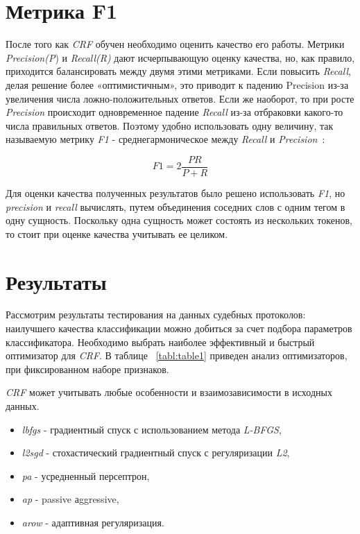 \documentclass{csmathnotes}
\begin{document}
\section*{Метрика F1}
После того как \emph{CRF} обучен необходимо оценить качество его работы. 
Метрики \emph{Precision(P}) и \emph{Recall(R)} дают исчерпывающую оценку качества, но, как правило, приходится балансировать между двумя этими метриками.
Если повысить \emph{Recall}, делая решение более «оптимистичным», это приводит к падению Precision из-за увеличения числа ложно-положительных ответов.
Если же наоборот, то при росте \emph{Precision} происходит одновременное падение \emph{Recall} из-за отбраковки какого-то числа правильных ответов.
Поэтому удобно использовать одну величину, так называемую метрику \emph{F1} - среднегармоническое между \emph{Recall} и \emph{Precision}~\cite{А1}:

\begin{equation}
F1 = 2\frac{P R}{P + R} 
\end{equation}

Для оценки качества полученных результатов было решено использовать \emph{F1}, но \emph{precision} и \emph{recall} вычислять, путем объединения соседних слов с одним тегом в одну сущность.
Поскольку одна сущность может состоять из нескольких токенов, то стоит при оценке качества учитывать ее целиком. 

\section*{Результаты}
Рассмотрим результаты тестирования на данных судебных протоколов: наилучшего качества классификации можно добиться за счет подбора параметров классификатора. Необходимо выбрать наиболее эффективный и быстрый оптимизатор для \emph{CRF}. В таблице ~\ref{tabl:table1} приведен анализ оптимизаторов, при фиксированном наборе признаков.


\emph{CRF} может учитывать любые особенности и взаимозависимости в исходных данных.
\begin{itemize}
    \item \emph{lbfgs} - градиентный спуск с использованием метода 
    \emph{L-BFGS},
    \item \emph{l2sgd} - стохастический  градиентный спуск с регуляризации \emph{L2},
    \item \emph{pa} - усредненный персептрон,
    \item \emph{ap} - passive аggressive,
    \item \emph{arow} - адаптивная регуляризация.
\end{itemize}
\end{document}

